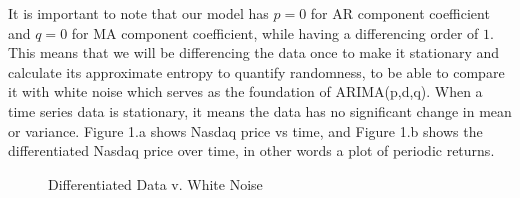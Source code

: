 \documentclass{article}[12pt]
\begin{document}
        It is important to note that our model has $p=0$ for AR component coefficient and $q=0$ for MA component coefficient, while having a differencing order of $1$. This means that we will be differencing the data once to make it stationary and calculate its approximate entropy to quantify randomness, to be able to compare it with white noise which serves as the foundation of ARIMA(p,d,q). When a time series data is stationary, it means the data has no significant change in mean or variance. Figure 1.a shows Nasdaq price vs time, and Figure 1.b shows the differentiated Nasdaq price over time, in other words a plot of periodic returns.
        
        \begin{figure}[htbp]
            \centering
            \hfill
            \caption{Differentiated Data v. White Noise}
          \end{figure}
\end{document}
